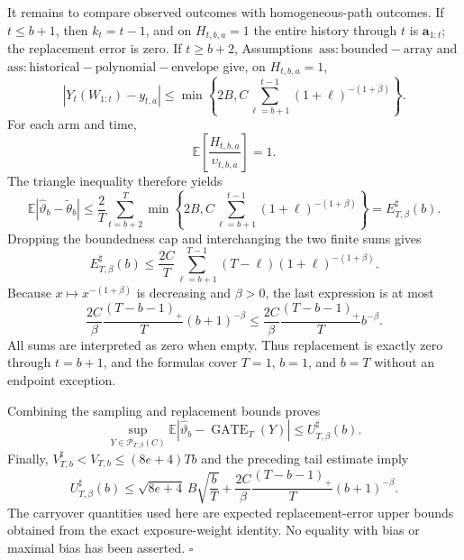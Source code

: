 It remains to compare observed outcomes with homogeneous-path outcomes. If \(t\le b+1\), then \(k_t=t-1\), and on \(H_{t,b,a}=1\) the entire history through \(t\) is \(\mathbf a_{1:t}\); the replacement error is zero. If \(t\ge b+2\), Assumptions~\(\mathrm{ass:bounded-array}\) and \(\mathrm{ass:historical-polynomial-envelope}\) give, on \(H_{t,b,a}=1\),
\[
|Y_t(W_{1:t})-y_{t,a}|
\le\min\left\{2B,C\sum_{\ell=b+1}^{t-1}(1+\ell)^{-(1+\beta)}\right\}.
\]
For each arm and time,
\[
\mathbb E\left[\frac{H_{t,b,a}}{\upsilon_{t,b,a}}\right]=1.
\]
The triangle inequality therefore yields
\[
\mathbb E|\widehat\vartheta_b-\widetilde\theta_b|
\le\frac2T\sum_{t=b+2}^T
\min\left\{2B,C\sum_{\ell=b+1}^{t-1}(1+\ell)^{-(1+\beta)}\right\}
=E_{T,\beta}^{\sharp}(b).
\]
Dropping the boundedness cap and interchanging the two finite sums gives
\[
E_{T,\beta}^{\sharp}(b)
\le\frac{2C}{T}\sum_{\ell=b+1}^{T-1}(T-\ell)(1+\ell)^{-(1+\beta)}.
\]
Because \(x\mapsto x^{-(1+\beta)}\) is decreasing and \(\beta>0\), the last expression is at most
\[
\frac{2C}{\beta}\frac{(T-b-1)_+}{T}(b+1)^{-\beta}
\le\frac{2C}{\beta}\frac{(T-b-1)_+}{T}b^{-\beta}.
\]
All sums are interpreted as zero when empty. Thus replacement is exactly zero through \(t=b+1\), and the formulas cover \(T=1\), \(b=1\), and \(b=T\) without an endpoint exception.

Combining the sampling and replacement bounds proves
\[
\sup_{Y\in\mathcal P_{T,\beta}(C)}
\mathbb E|\widehat\vartheta_b-\operatorname{GATE}_T(Y)|
\le U_{T,\beta}^{\sharp}(b).
\]
Finally, \(V_{T,b}^{\sharp}<V_{T,b}\le(8e+4)Tb\) and the preceding tail estimate imply
\[
U_{T,\beta}^{\sharp}(b)
\le\sqrt{8e+4}\,B\sqrt{\frac bT}
+\frac{2C}{\beta}\frac{(T-b-1)_+}{T}(b+1)^{-\beta}.
\]
The carryover quantities used here are expected replacement-error upper bounds obtained from the exact exposure-weight identity. No equality with bias or maximal bias has been asserted. \(\square\)